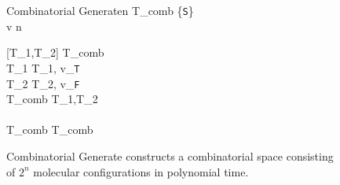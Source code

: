 
\begin{figure}[htbp]
	\renewcommand{\figurename}{Algorithm}
	\renewcommand{\thepseudocode}{\ref{combinatorialGenerate}}
	
	\begin{center}

	\begin{pseudocode}[shadowbox]{Combinatorial Generate}{n}
		T_{comb} \GETS \{\texttt{S}\} \\
	
		\FOR v   n \DO
			\BEGIN
			
			[T_1,T_2] \GETS {} T_{comb}\text{)}\\
			T_1 \GETS {}T_1, v_{\texttt{T}} \text{)}\\
			T_2 \GETS {}T_2, v_{\texttt{F}} \text{)}\\
			T_{comb} \GETS {}T_1,T_2\text{)}\\
		\END
		\\
		T_{comb} \GETS {}T_{comb}\text{)} \\
	\end{pseudocode}

\caption{{\sc Combinatorial Generate} constructs a combinatorial space consisting of $2^n$ molecular configurations in polynomial time.}
\label{combinatorialGenerate}
\end{center}
\end{figure}
